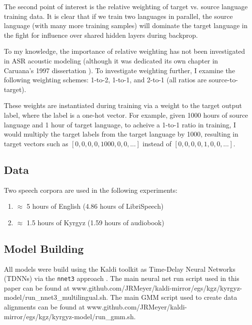 \documentclass[a4paper]{article}
\begin{document}
The second point of interest is the relative weighting of target vs. source language training data. It is clear that if we train two languages in parallel, the source language (with many more training samples) will dominate the target language in the fight for influence over shared hidden layers during backprop.

To my knowledge, the importance of relative weighting has not been investigated in ASR acoustic modeling (although it was dedicated its own chapter in Caruana's 1997 dissertation \cite{caruana1997}). To investigate weighting further, I examine the following weighting schemes: 1-to-2, 1-to-1, and 2-to-1 (all ratios are source-to-target).

These weights are instantiated during training via a weight to the target output label, where the label is a one-hot vector. For example, given 1000 hours of source language and 1 hour of target language, to acheive a 1-to-1 ratio in training, I would multiply the target labels from the target language by 1000, resulting in target vectors such as \texttt{$[0, 0, 0, 0, 1000, 0, 0, \ldots]$} instead of \texttt{$[0, 0, 0, 0, 1, 0, 0, \ldots]$}.



\subsection{Data}

Two speech corpora are used in the following experiments:

\begin{enumerate}
\item $\approx$ 5 hours of English (4.86 hours of LibriSpeech)
\item $\approx$ 1.5 hours of Kyrgyz (1.59 hours of audiobook)
\end{enumerate}

\subsection{Model Building}

All models were build using the Kaldi toolkit as Time-Delay Neural Networks (TDNNs) via the \texttt{nnet3} approach \cite{povey2011,peddinti2015}. The main neural net run script used in this paper can be found at www.github.com/JRMeyer/kaldi-mirror/egs/kgz/kyrgyz-model/run\_nnet3\_multilingual.sh. The main GMM script used to create data alignments can be found at www.github.com/JRMeyer/kaldi-mirror/egs/kgz/kyrgyz-model/run\_gmm.sh.
\end{document}
